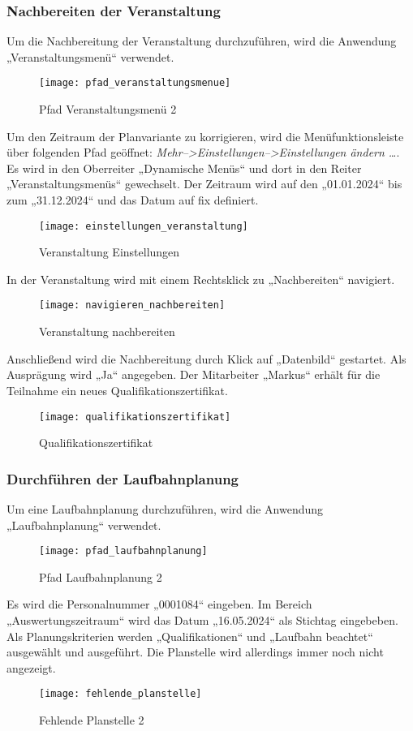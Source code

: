\subsubsection{Nachbereiten der Veranstaltung}
Um die Nachbereitung der Veranstaltung durchzuführen, wird die Anwendung „Veranstaltungsmenü“ verwendet.
\begin{figure}[H]
	\centering
	\texttt{[image: pfad\_veranstaltungsmenue]}
	\caption{Pfad Veranstaltungsmenü 2}
	\label{fig:pfad_veranstaltungsmenue2}
\end{figure}
Um den Zeitraum der Planvariante zu korrigieren, wird die Menüfunktionsleiste über folgenden Pfad geöffnet: \textit{Mehr-->Einstellungen-->Einstellungen ändern …}. Es wird in den Oberreiter „Dynamische Menüs“ und dort in den Reiter „Veranstaltungsmenüs“ gewechselt. Der Zeitraum wird auf den „01.01.2024“ bis zum „31.12.2024“ und das Datum auf fix definiert.
\begin{figure}[H]
	\centering
	\texttt{[image: einstellungen\_veranstaltung]}
	\caption{Veranstaltung Einstellungen}
	\label{fig:einstellungen_veranstaltung}
\end{figure}
In der Veranstaltung wird mit einem Rechtsklick zu „Nachbereiten“ navigiert.
\begin{figure}[H]
	\centering
	\texttt{[image: navigieren\_nachbereiten]}
	\caption{Veranstaltung nachbereiten}
	\label{fig:navigieren_nachbereiten}
\end{figure}
Anschließend wird die Nachbereitung durch Klick auf „Datenbild“ gestartet. Als Ausprägung wird „Ja“ angegeben. Der Mitarbeiter „Markus“ erhält für die Teilnahme ein neues Qualifikationszertifikat.
\begin{figure}[H]
	\centering
	\texttt{[image: qualifikationszertifikat]}
	\caption{Qualifikationszertifikat}
	\label{fig:qualifikationszertifikat}
\end{figure}

\subsubsection{Durchführen der Laufbahnplanung}
Um eine Laufbahnplanung durchzuführen, wird die Anwendung „Laufbahnplanung“ verwendet.
\begin{figure}[H]
	\centering
	\texttt{[image: pfad\_laufbahnplanung]}
	\caption{Pfad Laufbahnplanung 2}
	\label{fig:pfad_laufbahnplanung2}
\end{figure}
Es wird die Personalnummer „0001084“ eingeben. Im Bereich „Auswertungszeitraum“ wird das Datum „16.05.2024“ als Stichtag eingebeben. Als Planungskriterien werden „Qualifikationen“ und „Laufbahn beachtet“ ausgewählt und ausgeführt. Die Planstelle wird allerdings immer noch nicht angezeigt.
\begin{figure}[H]
	\centering
	\texttt{[image: fehlende\_planstelle]}
	\caption{Fehlende Planstelle 2}
	\label{fig:fehlende_planstelle2}
\end{figure}


